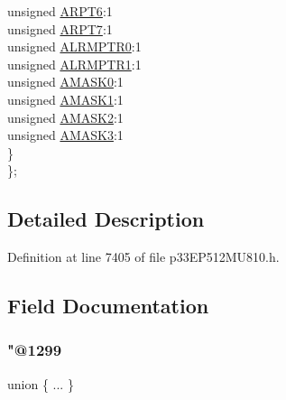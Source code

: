 \begin{DoxyCompactItemize}
\begin{tabbing}
\>\>unsigned \hyperlink{structtag_a_l_c_f_g_r_p_t_b_i_t_s_a09d2c53db922c9be5e3ac138f1ade0be}{ARPT6}:1\\
\>\>unsigned \hyperlink{structtag_a_l_c_f_g_r_p_t_b_i_t_s_a830c8a9e2d9044cd3da8bbb069573dbf}{ARPT7}:1\\
\>\>unsigned \hyperlink{structtag_a_l_c_f_g_r_p_t_b_i_t_s_a30611a4c65d7ad641abae1ea635f8632}{ALRMPTR0}:1\\
\>\>unsigned \hyperlink{structtag_a_l_c_f_g_r_p_t_b_i_t_s_ae85bbb6eb90c1e17f58dd7318f66519c}{ALRMPTR1}:1\\
\>\>unsigned \hyperlink{structtag_a_l_c_f_g_r_p_t_b_i_t_s_a95dd8b113dcfed1bc1d849daa19b5ff9}{AMASK0}:1\\
\>\>unsigned \hyperlink{structtag_a_l_c_f_g_r_p_t_b_i_t_s_ab2471d64a5d365146dd4f4b33e397658}{AMASK1}:1\\
\>\>unsigned \hyperlink{structtag_a_l_c_f_g_r_p_t_b_i_t_s_aba9c555714b7b07ffd933dd58a058714}{AMASK2}:1\\
\>\>unsigned \hyperlink{structtag_a_l_c_f_g_r_p_t_b_i_t_s_ab5625f2606a7d1824938bd05e369629e}{AMASK3}:1\\
\>\} \\
\}; \\

\end{tabbing}\end{DoxyCompactItemize}


\subsection{Detailed Description}


Definition at line 7405 of file p33\+E\+P512\+M\+U810.\+h.



\subsection{Field Documentation}
\mbox{\label{structtag_a_l_c_f_g_r_p_t_b_i_t_s_abcb38a96d3f857c3bf3d7a6d4fa8bdc9}} 
\subsubsection{\texorpdfstring{"@1299}{@1299}}
{\footnotesize\ttfamily union \{ ... \} }

\mbox{\label{structtag_a_l_c_f_g_r_p_t_b_i_t_s_a04cd84f60551c23f80f943b156bec548}} 
